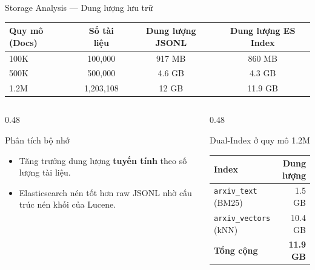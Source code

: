 \begin{frame}{Storage Analysis --- Dung lượng lưu trữ}
\centering
\renewcommand{\arraystretch}{1.1}
{\small
\begin{tabular}{l c c c}
\toprule
\textbf{Quy mô (Docs)} & \textbf{Số tài liệu} & \textbf{Dung lượng JSONL} & \textbf{Dung lượng ES Index} \\
\midrule
100K & 100,000 & 917 MB & 860 MB \\
500K & 500,000 & 4.6 GB & 4.3 GB \\
1.2M & 1,203,108 & 12 GB & 11.9 GB \\
\bottomrule
\end{tabular}
}

\vspace{0.2cm}

\begin{columns}[T]
\begin{column}{0.48\textwidth}
\begin{block}{Phân tích bộ nhớ}
{\footnotesize
\begin{itemize}\itemsep0pt \parskip0pt 
    \item Tăng trưởng dung lượng \textbf{tuyến tính} theo số lượng tài liệu.
    \item Elasticsearch nén tốt hơn raw JSONL nhờ cấu trúc nén khối của Lucene.
\end{itemize}
}
\end{block}
\end{column}
\begin{column}{0.48\textwidth}
\begin{exampleblock}{Dual-Index ở quy mô 1.2M}
{\footnotesize
\begin{tabular}{l r}
\toprule
\textbf{Index} & \textbf{Dung lượng} \\
\midrule
\texttt{arxiv\_text} (BM25) & 1.5 GB \\
\texttt{arxiv\_vectors} (kNN) & 10.4 GB \\
\textbf{Tổng cộng} & \textbf{11.9 GB} \\
\bottomrule
\end{tabular}
}
\end{exampleblock}
\end{column}
\end{columns}
\end{frame}


